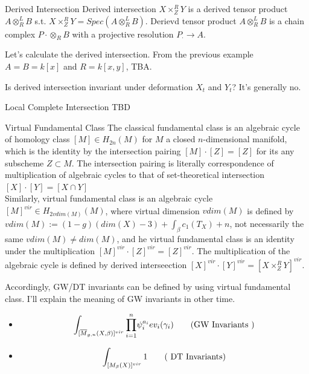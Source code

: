 \documentclass{article}
\begin{document}
\begin{definition}{Derived Intersection}{}
Derived intersection $X\times_Z^R Y$ is a derived tensor product $A\otimes_R^L B$ s.t. $X\times_Z^R Y = Spec(A\otimes_R^L B)$.
Derievd tensor product $A\otimes_R^L B$ is a chain complex $P\cdot \otimes_R B$ with a projective resolution $P_\cdot\to A$.
\end{definition}


\noindent
Let's calculate the derived intersection. From the previous example $A=B=k[x]$ and $R=k[x,y]$, TBA.


\begin{question}{}{}
Is derived intersection invariant under deformation $X_t$ and $Y_t$? It's generally no.
\end{question}


\begin{remark} {Local Complete Intersection}{}
TBD
\end{remark}


\begin{example}{Virtual Fundamental Class}{}
The classical fundamental class is an algebraic cycle of homology class $[M]\in H_{2n}(M)$ for $M$ a closed $n$-dimensional manifold,
which is the identity by the intersection pairing $[M]\cdot[Z] =[Z]$ for its any subscheme $Z\subset M$. 
The intersection pairing is literally correspondence of multiplication of algebraic cycles to that of set-theoretical intersection
$[X]\cdot [Y] = [X\cap Y]$ \\

Similarly, virtual fundamental class is an algebraic cycle $[M]^{vir} \in H_{2 vdim(M)}(M)$,
where virtual dimension $vdim(M)$ is defined by $vdim(M) := (1-g) (dim(X)-3) + \int_\beta c_1(T_X) + n$,
not necessarily the same $vdim(M) \neq dim(M)$,
and he virtual fundamental class is an identity under the multiplication $[M]^{vir}\cdot [Z]^{vir} = [Z]^{vir}$.
The multiplication of the algebraic cycle is defined by derived interseection $[X]^{vir}\cdot [Y]^{vir} = [X\times_Z^R Y]^{vir}$. \\
\end{example}


\noindent
Accordingly, GW/DT invariants can be defined by using virtual fundamental class. 
I'll explain the meaning of GW invariants in other time.


\begin{example} {}{}
\begin{itemize}
\item \[ \int_{[\overline{M}_{g,n} (X,\beta)]^{vir}} \underset{i=1}{\overset{n}{\prod}} \psi_i^{a_i} ev_i(\gamma_i)
\tag{\text{GW Invariants }} \] 

\item \[ \int_{[M_\beta (X)]^{vir}} 1 
\tag{ \text{DT Invariants}} \]
\end{itemize}
\end{example}
\end{document}
